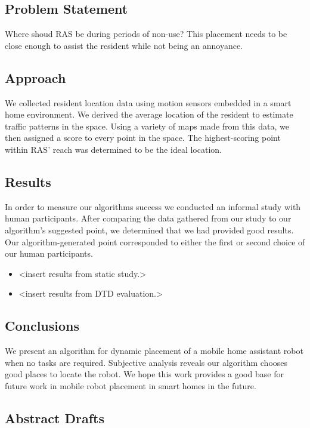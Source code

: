 \documentclass[11pt, conference, a4paper]{IEEEtran}
\begin{document}
\subsection{Problem Statement}
Where shoud RAS be during periods of non-use? This placement needs to be close enough to assist the resident while not being an annoyance. 


\subsection{Approach}
We collected resident location data using motion sensors embedded in a smart home environment. We derived the average location of the resident to estimate traffic patterns in the space. Using a variety of maps made from this data, we then assigned a score to every point in the space. The highest-scoring point within RAS' reach was determined to be the ideal location.


\subsection{Results}
In order to measure our algorithms success we conducted an informal study with human participants. After comparing the data gathered from our study to our algorithm's suggested point, we determined that we had provided good results. Our algorithm-generated point corresponded to either the first or second choice of our human participants.
\begin{itemize}
    \item \textless insert results from static study.\textgreater 
    \item \textless insert results from DTD evaluation.\textgreater
\end{itemize}



\subsection{Conclusions}
We present an algorithm for dynamic placement of a mobile home assistant robot 
when no tasks are required. Subjective analysis reveals our algorithm chooses 
good places to locate the robot. We hope this work provides a good base for 
future work in mobile robot placement in smart homes in the future.


\subsection{Abstract Drafts}
\end{document}
